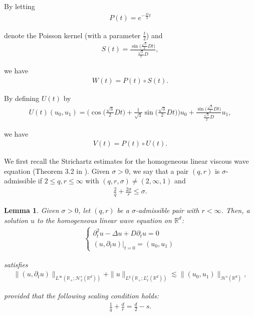 \documentclass[letterpaper, 11pt,  reqno]{amsart}
\newtheorem{lemma}[theorem]{Lemma}
\newcommand{\1}{\hspace{0.5mm}\text{I}\hspace{0.2mm}}
\newcommand{\noi}{\noindent}
\newcommand{\R}{\mathbb{R}}
\newcommand{\Dl}{\Delta}
\newcommand{\s}{\sigma}
\newcommand{\dt}{\partial_t}
\renewcommand{\H}{\mathcal{H}}
\numberwithin{equation}{section}
\numberwithin{theorem}{section}
\begin{document}
\noi
By letting 
\begin{align}
P(t) = e^{-\frac{D}{2}t}
\label{A2a}
\end{align}


\noi
 denote the Poisson kernel (with a parameter $\frac{t}{2}$)
and 
\begin{align*}
S(t) =  \frac{\sin \big(\tfrac{\sqrt{3}}{2} Dt\big)}{\tfrac{\sqrt{3}}{2} D}, 
\end{align*}

\noi
we have 
\begin{align*}
W(t) = P(t)\circ  S(t) .
\end{align*}

\noi
By defining $U(t)$ by 
\begin{align*}
U (t) (u_0, u_1)
=  \Big(\cos \big(\tfrac{\sqrt{3}}{2} Dt\big) 
+ \frac{1}{\sqrt{3}}\sin \big(\tfrac{\sqrt{3}}{2} Dt\big) \Big)u_0
+ \frac{\sin \big(\tfrac{\sqrt{3}}{2} Dt\big)}{\tfrac{\sqrt{3}}{2} D} u_1, 
\end{align*}

\noi
we have 
\begin{align}
V(t) = P(t) \circ U(t) .
\label{A6}
\end{align}


We first recall 
the Strichartz estimates for the homogeneous linear viscous wave equation
(Theorem 3.2 in \cite{KC}).
Given  $\s > 0$, 
we say that a pair $(q, r)$ is $\s$-admissible 
if $2 \leq q, r \leq \infty$ with $(q, r, \s) \ne (2, \infty, 1)$ 
and 
\begin{align}
\frac 2q + \frac{2\s}{r} \leq \s.
\label{admis1}
\end{align}

\begin{lemma}\label{LEM:Str}
Given $\s > 0$, let $(q, r)$ 
be a $\s$-admissible pair with $r < \infty$.
Then, a solution $u$ to the homogeneous linear wave equation on $\R^d$:
\begin{align*}
\begin{cases}
\dt^2 u - \Dl  u  + D \dt u    = 0\\
(u, \dt u) |_{t = 0} = (u_0, u_1)
\end{cases}
\end{align*}

\noi
satisfies
\begin{align}
\| (u, \dt u) \|_ {L^\infty(\R_+;  \H^s_x(\R^d)) } + 
 \| u  \|_{L^q(\R_+; L^r_x(\R^d))}
\lesssim 
\|(u_0, u_1) \|_{\H^s(\R^d)}, 
\label{hStr}
\end{align}

\noi
provided that the following scaling condition holds:
\begin{align}
 \frac{1}{q} + \frac dr  = \frac d2-  s.
\label{admis2}
\end{align}



\end{lemma}
\end{document}
